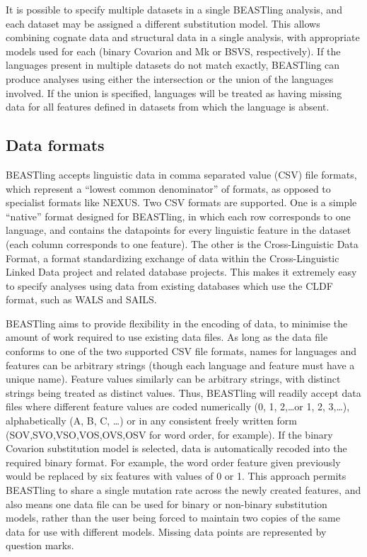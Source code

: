 \documentclass[twocolumn,10pt]{scrartcl}
\begin{document}
It is possible to specify multiple datasets in a single BEASTling analysis, and each dataset may be assigned a different substitution model.  This allows combining cognate data and structural data in a single analysis, with appropriate models used for each (binary Covarion and Mk or BSVS, respectively).  If the languages present in multiple datasets do not match exactly, BEASTling can produce analyses using either the intersection or the union of the languages involved.  If the union is specified, languages will be treated as having missing data for all features defined in datasets from which the language is absent.

\subsection{Data formats}

BEASTling accepts linguistic data in comma separated value (CSV) file formats, which represent a ``lowest common denominator'' of formats, as opposed to specialist formats like NEXUS.  Two CSV formats are supported.  One is a simple ``native'' format designed for BEASTling, in which each row corresponds to one language, and contains the datapoints for every linguistic feature in the dataset (each column corresponds to one feature).  The other is the Cross-Linguistic Data Format, a format standardizing exchange of data within the Cross-Linguistic Linked Data project and related database projects.  This makes it extremely easy to specify analyses using data from existing databases which use the CLDF format, such as WALS and SAILS.

BEASTling aims to provide flexibility in the encoding of data, to minimise the amount of work required to use existing data files.  As long as the data file conforms to one of the two supported CSV file formats, names for languages and features can be arbitrary strings (though each language and feature must have a unique name).  Feature values similarly can be arbitrary strings, with distinct strings being treated as distinct values.  Thus, BEASTling will readily accept data files where different feature values are coded numerically (0, 1, 2,\ldots or 1, 2, 3,\ldots), alphabetically (A, B, C, \ldots) or in any consistent freely written form (SOV,SVO,VSO,VOS,OVS,OSV for word order, for example).  If the binary Covarion substitution model is selected, data is automatically recoded into the required binary format.  For example, the word order feature given previously would be replaced by six features with values of 0 or 1.  This approach permits BEASTling to share a single mutation rate across the newly created features, and also means one data file can be used for binary or non-binary substitution models, rather than the user being forced to maintain two copies of the same data for use with different models.  Missing data points are represented by question marks.
\end{document}

